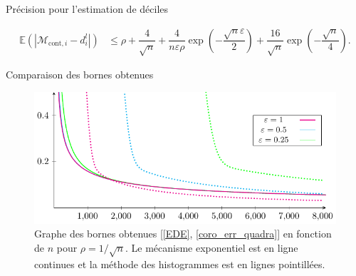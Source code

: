 \documentclass[10pt,serif]{beamer}
\begin{document}
\begin{frame}{Précision pour l'estimation de déciles}
\begin{itemize}
{\begin{theorem}
        \begin{align*}
            \mathbb E(|\mathcal M_{\text{cont}, i} - d_i^l|) & \leq \rho + \dfrac{4}{\sqrt n} +\dfrac{4}{n\varepsilon\rho}\exp\left( -\dfrac{\sqrt n \varepsilon}{2} \right) + \dfrac{16}{\sqrt{n}}\exp\left( -\dfrac{\sqrt n }{4} \right).
        \end{align*}
      \end{theorem}}
    \end{itemize}
  \end{frame}

  \begin{frame}{Comparaison des bornes obtenues}
    \begin{figure}[H]
      \centering
      \includegraphics[]{"./proofs/figures/u1Me9JP1u1pCrW1j.pdf"}
      \caption{Graphe des bornes obtenues [\ref{EDE}, \ref{coro_err_quadra}] en fonction de \(n\) pour \(\rho = 1/\sqrt n\). Le mécanisme exponentiel est en ligne continues et la méthode des histogrammes est en lignes pointillées.}
      \label{bcomp}
    \end{figure}
  \end{frame}
\end{document}
